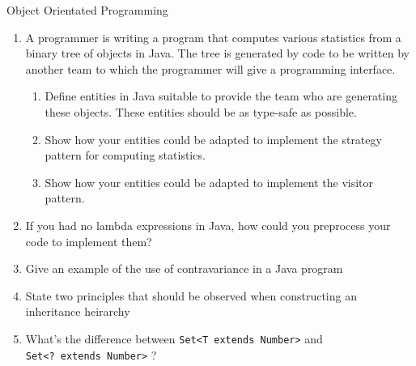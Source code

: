 \documentclass{tripos}
\begin{document}
\begin{question}[MockIA,year=2025,paper=1,question=2,author=nobody]{Object Orientated Programming}

  \begin{enumerate}
  \item
    A programmer is writing a program that computes various statistics
    from a binary tree of objects in Java. The tree is generated by code
    to be written by another team to which the programmer will give a
    programming interface.

  \begin{enumerate}
  \item Define entities in Java suitable to provide the team who are generating these objects. These entities should be as type-safe as possible. 
  \item Show how your entities could be adapted to implement the strategy pattern for computing statistics. 
  \item Show how your entities could be adapted to implement the visitor pattern. 
  \end{enumerate}
  
\item
  If you had no lambda expressions in Java, how could you preprocess your code to implement them? 

\item Give an example of the use of contravariance in a Java program 
\item State two principles that should be observed when constructing an inheritance heirarchy 
\item What's the difference between \verb|Set<T extends Number>| and \\
  \verb|Set<? extends Number>| ? 
\end{enumerate}
\eject
\end{question}
\end{document}
